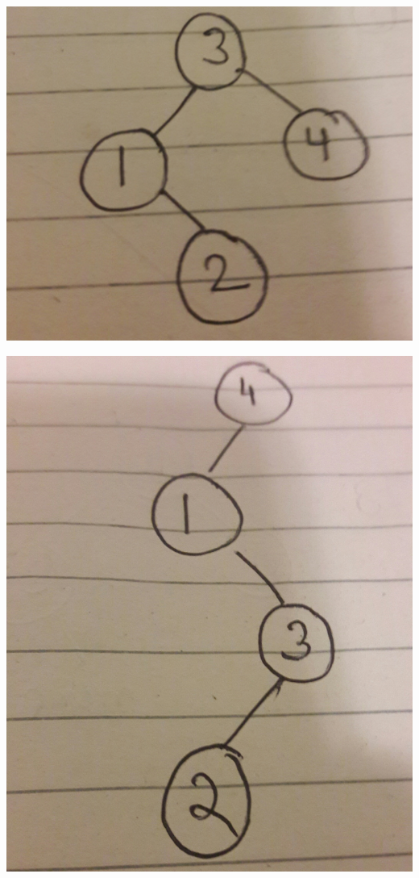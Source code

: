 \documentclass{article}
\begin{document}
\includegraphics[scale=0.05]{5.jpg}




\includegraphics[scale=0.05]{6.jpg}
\end{document}
